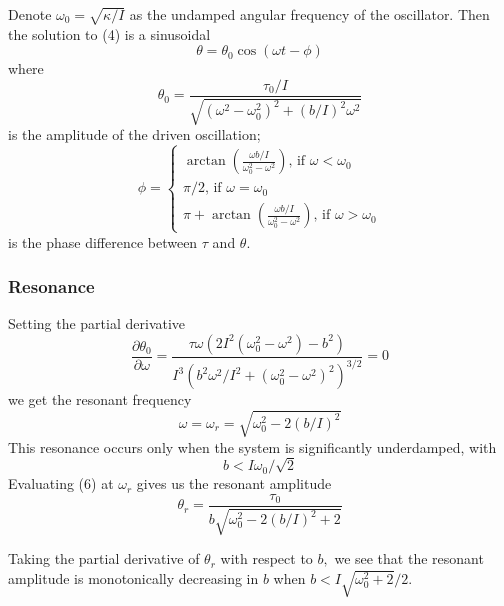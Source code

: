 Denote $\omega_0=\sqrt{\kappa/I}$ as the undamped angular frequency of the oscillator. Then the solution to (4) is a sinusoidal
\begin{equation}
\theta = \theta_0 \cos(\omega t -\phi)
\end{equation}
where
\begin{equation}
\theta_0 = \frac{\tau_0/I}{\sqrt{(\omega^2-\omega_0^2)^2+(b/I)^2\omega^2}}
\end{equation}
is the amplitude of the driven oscillation;
\begin{equation}
\phi = 
\begin{cases}
\arctan\left(\frac{\omega b/I}{\omega_0^2-\omega^2}\right)\text{, if } \omega< \omega_0\\
\pi/ 2\text{,     if } \omega= \omega_0\\
\pi + \arctan\left(\frac{\omega b/I}{\omega_0^2-\omega^2}\right)\text{, if } \omega> \omega_0
\end{cases}
\end{equation}
is the phase difference between $\tau$ and $\theta.$
\subsubsection{Resonance}
Setting the partial derivative
\begin{equation}
\frac{\partial\theta_0}{\partial\omega}
= \frac{\tau \omega\left(2 I^{2}\left(\omega_0^{2}-\omega^{2}\right)-b^{2}\right)}{I^{3}\left({b^{2} \omega^{2}}/{I^{2}}+\left(\omega_0^{2}-\omega^{2}\right)^{2}\right)^{3 / 2}}=0
\end{equation}
we get the resonant frequency
\begin{equation}
\omega = \omega_r = \sqrt{\omega_0^2-2(b/I)^2}
\end{equation}
This resonance occurs only when the system is significantly underdamped, with
\begin{equation}
b < I\omega_0/\sqrt2
\end{equation}
Evaluating (6) at $\omega_r$ gives us the resonant amplitude
\begin{equation}
\theta_r = \frac{\tau_0}{b \sqrt{\omega_0^2-2(b/I)^2+2}}
\end{equation}

Taking the partial derivative of $\theta_r$ with respect to $b,$ we see that the resonant amplitude is monotonically decreasing in $b$ when $b< I\sqrt{\omega_0^2+2}/2$.

